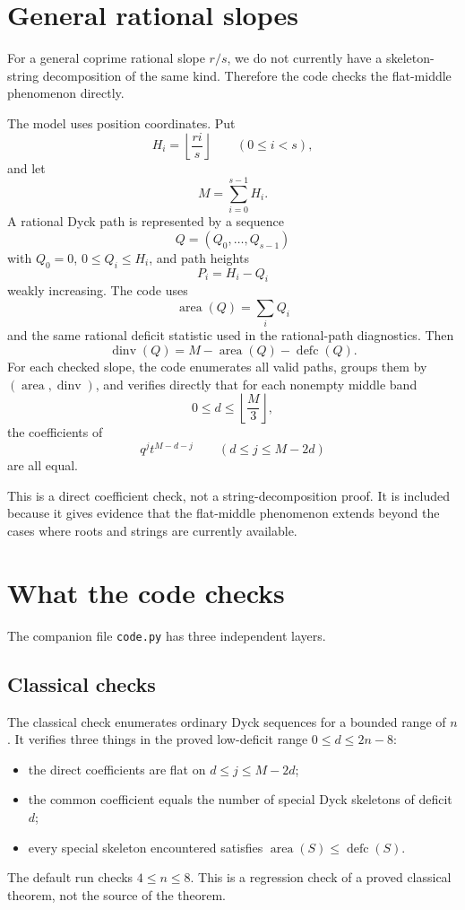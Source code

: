 \documentclass{article}
\DeclareMathOperator{\area}{area}
\DeclareMathOperator{\dinv}{dinv}
\DeclareMathOperator{\defc}{defc}
\begin{document}
\section{General rational slopes}

For a general coprime rational slope \(r/s\), we do not currently have a
skeleton-string decomposition of the same kind.  Therefore the code checks the
flat-middle phenomenon directly.

The model uses position coordinates.  Put
\[
  H_i=\left\lfloor \frac{ri}{s}\right\rfloor
  \qquad(0\le i<s),
\]
and let
\[
  M=\sum_{i=0}^{s-1}H_i.
\]
A rational Dyck path is represented by a sequence
\[
  Q=(Q_0,\ldots,Q_{s-1})
\]
with \(Q_0=0\), \(0\le Q_i\le H_i\), and path heights
\[
  P_i=H_i-Q_i
\]
weakly increasing.  The code uses
\[
  \area(Q)=\sum_i Q_i
\]
and the same rational deficit statistic used in the rational-path diagnostics.
Then
\[
  \dinv(Q)=M-\area(Q)-\defc(Q).
\]
For each checked slope, the code enumerates all valid paths, groups them by
\((\area,\dinv)\), and verifies directly that for each nonempty middle band
\[
  0\le d\le \left\lfloor\frac{M}{3}\right\rfloor,
\]
the coefficients of
\[
  q^j t^{M-d-j}
  \qquad(d\le j\le M-2d)
\]
are all equal.

This is a direct coefficient check, not a string-decomposition proof.  It is
included because it gives evidence that the flat-middle phenomenon extends
beyond the cases where roots and strings are currently available.

\section{What the code checks}

The companion file \texttt{code.py} has three independent layers.

\subsection*{Classical checks}

The classical check enumerates ordinary Dyck sequences for a bounded range of
\(n\).  It verifies three things in the proved low-deficit range
\(0\le d\le2n-8\):
\begin{itemize}
\item the direct coefficients are flat on \(d\le j\le M-2d\);
\item the common coefficient equals the number of special Dyck skeletons of
      deficit \(d\);
\item every special skeleton encountered satisfies \(\area(S)\le\defc(S)\).
\end{itemize}
The default run checks \(4\le n\le8\).  This is a regression check of a proved
classical theorem, not the source of the theorem.
\end{document}
